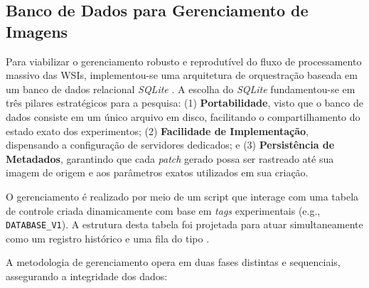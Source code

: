 \subsection{Banco de Dados para Gerenciamento de Imagens}\label{subsec:met_banco_dados}

Para viabilizar o gerenciamento robusto e reprodutível do fluxo de processamento massivo das WSIs, implementou-se uma arquitetura de orquestração baseada em um banco de dados relacional \textit{SQLite} \cite{sqlite}. A escolha do \textit{SQLite} fundamentou-se em três pilares estratégicos para a pesquisa: (1) \textbf{Portabilidade}, visto que o banco de dados consiste em um único arquivo em disco, facilitando o compartilhamento do estado exato dos experimentos; (2) \textbf{Facilidade de Implementação}, dispensando a configuração de servidores dedicados; e (3) \textbf{Persistência de Metadados}, garantindo que cada \textit{patch} gerado possa ser rastreado até sua imagem de origem e aos parâmetros exatos utilizados em sua criação.

O gerenciamento é realizado por meio de um script que interage com uma tabela de controle criada dinamicamente com base em \textit{tags} experimentais (e.g., \texttt{DATABASE\_V1}). A estrutura desta tabela foi projetada para atuar simultaneamente como um registro histórico e uma fila do tipo  \cite{cormen2022introduction}.

A metodologia de gerenciamento opera em duas fases distintas e sequenciais, assegurando a integridade dos dados:


